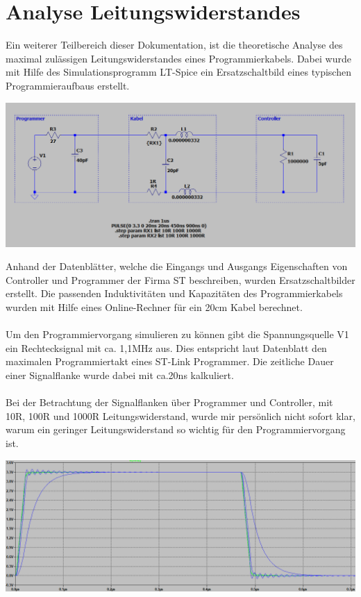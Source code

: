 \documentclass[a4paper,11pt]{scrartcl}
\begin{document}
\section{Analyse Leitungswiderstandes}

Ein weiterer Teilbereich dieser Dokumentation, ist die theoretische Analyse des maximal zulässigen Leitungswiderstandes eines Programmierkabels. Dabei wurde mit Hilfe des Simulationsprogramm \glqq LT-Spice\grqq{} ein Ersatzschaltbild eines typischen Programmieraufbaus erstellt.\\

\begin{center}
\includegraphics[width=17cm]{Bilder/LTC-SCHALTBILD.png}
\end{center}

Anhand der Datenblätter, welche die Eingangs und Ausgangs Eigenschaften von Controller und Programmer der Firma ST beschreiben, wurden Ersatzschaltbilder erstellt. Die passenden Induktivitäten und Kapazitäten des Programmierkabels wurden mit Hilfe eines Online-Rechner für ein 20cm Kabel berechnet.
\\
\\
Um den Programmiervorgang simulieren zu können gibt die Spannungsquelle V1 ein Rechtecksignal mit ca. 1,1MHz aus. Dies entspricht laut Datenblatt den maximalen Programmiertakt eines ST-Link Programmer. Die zeitliche Dauer einer Signalflanke wurde dabei mit ca.20ns kalkuliert.
\\
\\
Bei der Betrachtung der Signalflanken über Programmer und Controller, mit 10R, 100R und 1000R Leitungswiderstand, wurde mir persönlich nicht sofort klar, warum ein geringer Leitungswiderstand so wichtig für den Programmiervorgang ist. 

\begin{center}
\includegraphics[width=17cm]{Bilder/LTC-SIGNALVERLAUF1.png}
\end{center}
\end{document}
